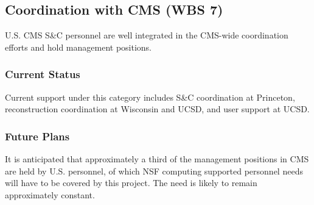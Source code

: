 \documentclass[11pt,a4paper]{article}
\begin{document}
\subsection{Coordination with CMS (WBS 7)}

U.S. CMS S\&C personnel are well integrated in the CMS-wide coordination
efforts and hold management positions.  

\subsubsection{Current Status}

Current support under this category includes S\&C coordination at
Princeton, reconstruction coordination at Wisconsin and UCSD, and user
support at UCSD.  

\subsubsection{Future Plans}

It is anticipated that approximately a third of the management positions
in CMS are held by U.S. personnel, of which NSF computing supported 
personnel needs will have to be covered by this project.  The need
is likely to remain approximately constant.
\end{document}
